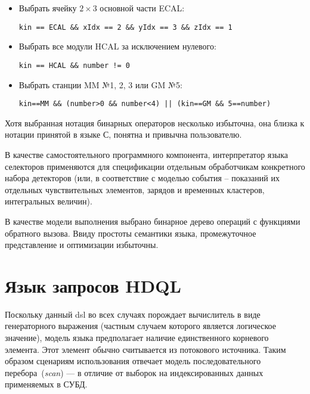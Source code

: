 \begin{itemize}
    \item Выбрать ячейку $2\times3$ основной части
    ECAL:
    
    \texttt{kin == ECAL \&\& xIdx == 2 \&\& yIdx == 3 \&\& zIdx == 1}

    \item Выбрать все модули HCAL за исключением нулевого:

    \texttt{kin == HCAL \&\& number != 0}

    \item Выбрать станции MM №1, 2, 3 или GM №5:

    \texttt{kin==MM \&\& (number>0 \&\& number<4) || (kin==GM \&\& 5==number)}
\end{itemize}

Хотя выбранная нотация бинарных операторов несколько избыточна, она
близка к нотации принятой в языке С, понятна и привычна пользователю.

В качестве самостоятельного программного компонента, интерпретатор языка
селекторов применяются для спецификации отдельным обработчикам конкретного
набора детекторов (или, в соответствие с моделью события -- показаний их
отдельных чувствительных элементов, зарядов и временных кластеров,
интегральных величин).

В качестве модели выполнения выбрано бинарное дерево операций с функциями
обратного вызова. Ввиду простоты семантики языка, промежуточное
представление и оптимизации избыточны.

\section{Язык запросов HDQL}

Поскольку данный \acrshort{dsl} во всех случаях порождает вычислитель в виде
генераторного выражения (частным случаем которого является логическое значение),
модель языка предполагает наличие единственного корневого элемента.
Этот элемент обычно считывается из потокового источника. Таким образом
сценариям использования отвечает модель последовательного
перебора~(\emph{scan}) --- в отличие от выборок на индексированных
данных применяемых в СУБД.

